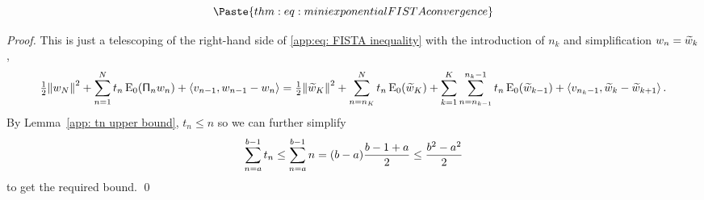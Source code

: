 \documentclass[smallextended]{svjour3}
\newcommand{\norm}[1]{{\left\lVert #1 \right\rVert}}
\newcommand{\IP}[2]{\left\langle #1,#2 \right\rangle}
\newcommand{\op}[1]{\operatorname{#1}}
\newcommand{\1}{\F{1}}
\newcommand*{\varf}[1]{%
	\IfEqCase{#1}{%
		{0}{u}%
		{1}{v}%
		{2}{w}%
	}[u#1]%
}
\newcommand*{\vars}[1]{%
	\IfEqCase{#1}{%
		{0}{\alpha}%
		{1}{\beta}%
		{2}{\gamma}%
		{3}{a}%
		{4}{b}%
		{5}{c}%
	}[k#1]%
}
\begin{document}
	
	
	\begin{lemma}\label{app:thm: mini exponential FISTA convergence}
		\begin{equation}
			\Paste{thm:eq: mini exponential FISTA convergence}
		\end{equation}
	\end{lemma}
	\begin{proof}
		This is just a telescoping of the right-hand side of \eqref{app:eq: FISTA inequality} with the introduction of $n_k$ and simplification $\varf2_n = \tilde{\varf2}_k$,
		\begin{equation}
			\tfrac12\norm{\varf2_N}^2 + \sum^N_{n=1} t_n\op{E}_0(\tens{\Pi}_n\varf2_n) + \IP{\varf1_{n-1}}{\varf2_{n-1}-\varf2_n} = \tfrac12\norm{\tilde{\varf2}_K}^2 + \sum_{n=n_K}^Nt_n\op{E}_0(\tilde{\varf2}_K) 
			+ \sum_{k=1}^K\sum_{n=n_{k-1}}^{n_k-1}t_n\op{E}_0(\tilde{\varf2}_{k-1}) 
			+ \IP{\varf1_{n_k-1}}{\tilde{\varf2}_k-\tilde{\varf2}_{k+1}}.
		\end{equation}
		By Lemma~\ref{app: tn upper bound}, $t_n\leq n$ so we can further simplify
		$$\sum_{n=\vars3}^{\vars4-1}t_n \leq \sum_{n=\vars3}^{\vars4-1}n = (\vars4-\vars3)\frac{\vars4-1+\vars3}{2} \leq \frac{\vars4^2-\vars3^2}{2}$$
		to get the required bound.
		\qed\end{proof}
	
\end{document}
